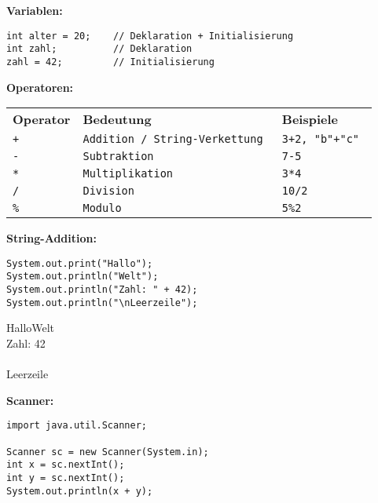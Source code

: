 \documentclass{../../sheet}
\begin{document}
\textbf{Variablen:}
\begin{center}
    \begin{verbatim}
int alter = 20;    // Deklaration + Initialisierung
int zahl;          // Deklaration
zahl = 42;         // Initialisierung
  \end{verbatim}
\end{center}
  \bigskip
  \textbf{Operatoren:}
  \begin{center}
    \begin{tabular}{l l l}
      \rowcolor{tablehead}
      \textbf{Operator
      }           & \textbf{Bedeutung
      }           & \textbf{Beispiele
      }                                           \\
      \texttt{+}  & \texttt{Addition / String-Verkettung
      }           & \texttt{3+2, "b"+"c"
      }                                           \\
      \texttt{-}  & \texttt{Subtraktion
      }           & \texttt{7-5
      }                                           \\
      \texttt{*}  & \texttt{Multiplikation
      }           & \texttt{3*4
      }                                           \\
      \texttt{/}  & \texttt{Division
      }           & \texttt{10/2
      }                                           \\
      \texttt{\%} & \texttt{Modulo
      }           & \texttt{5\%2
      }                                           \\
    \end{tabular}
\end{center}
\bigskip
\textbf{String-Addition:}
\begin{verbatim}
System.out.print("Hallo");
System.out.println("Welt");
System.out.println("Zahl: " + 42);
System.out.println("\nLeerzeile");
  \end{verbatim}
\begin{ausgabe}
HalloWelt\\
Zahl: 42\\\\
Leerzeile
\end{ausgabe}
\bigskip
\textbf{Scanner:}
  \begin{verbatim}
import java.util.Scanner;

Scanner sc = new Scanner(System.in);
int x = sc.nextInt();
int y = sc.nextInt();
System.out.println(x + y);
  \end{verbatim}
\newpage
\end{document}
